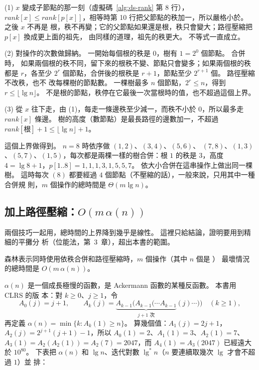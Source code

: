 \begin{whybox}
(1) $x$ 變成子節點的那一刻（虛擬碼~\ref{alg:ds-rank} 第 8 行），$\mathit{rank}[x] \le
\mathit{rank}[p[x]]$，相等時第 10 行把父節點的秩加一，所以嚴格小於。 之後 $x$ 不再是
根，秩不再變；它的父節點如果還是根，秩只會變大；路徑壓縮把 $p[x]$ 換成更上面的祖先，
由同樣的道理，祖先的秩更大。 不等式一直成立。

(2) 對操作的次數做歸納。 一開始每個根的秩是 $0$，樹有 $1 = 2^0$ 個節點。 合併時，
如果兩個根的秩不同，留下來的根秩不變、節點只會變多；如果兩個根的秩都是 $r$，各至少
$2^r$ 個節點，合併後的根秩是 $r + 1$，節點至少 $2^{r+1}$ 個。 路徑壓縮不改秩，也不
改每棵樹的節點數。 一棵樹最多 $n$ 個節點，$2^r \le n$，得到 $r \le \lfloor \lg n
\rfloor$。 不是根的節點，秩停在它最後一次當根時的值，也不超過這個上界。

(3) 從 $x$ 往下走，由 (1)，每走一條邊秩至少減一，而秩不小於 $0$，所以最多走
$\mathit{rank}[x]$ 條邊。 樹的高度（數節點）是最長路徑的邊數加一，不超過
$\mathit{rank}[\text{根}] + 1 \le \lfloor \lg n \rfloor + 1$。
\end{whybox}

這個上界做得到。 $n = 8$ 時依序做 $(1, 2)$、$(3, 4)$、$(5, 6)$、
$(7, 8)$、$(1, 3)$、$(5, 7)$、$(1, 5)$，每次都是兩棵一樣的樹合併：根 $1$ 的秩是 $3$，高度 $4 = \lg 8 + 1$，$p[1..8] = 1, 1,
1, 3, 1, 5, 5, 7$。 依大小合併在這串操作上做出同一棵樹。 這時每次
$(8)$ 都要經過 $4$ 個節點（不壓縮的話），一般來說，只用其中一種合併規
則，$m$ 個操作的總時間是 $\Theta(m \lg n)$。


\subsection{加上路徑壓縮：$O(m\,\alpha(n))$}

兩個技巧一起用，總時間的上界降到幾乎是線性。 這裡只給結論，證明要用到精細的平攤分
析（位能法，第~3~章），超出本書的範圍。

\begin{theorem}
\label{thm:ds-alpha}
森林表示同時使用依秩合併和路徑壓縮時，$m$ 個操作（其中 $n$ 個是 ）
最壞情況的總時間是 $O(m\,\alpha(n))$。
\end{theorem}

$\alpha(n)$ 是一個成長極慢的函數，是 Ackermann 函數的某種反函數。 本書用 CLRS 的版
本：對 $k \ge 0$、$j \ge 1$，令
\[
A_0(j) = j + 1, \qquad A_k(j) = \underbrace{A_{k-1}(A_{k-1}(\cdots A_{k-1}}_{j + 1
\text{ 次}}(j)\cdots)) \quad (k \ge 1),
\]
再定義 $\alpha(n) = \min\{k : A_k(1) \ge n\}$。 算幾個值：$A_1(j) = 2j + 1$，
$A_2(j) = 2^{j+1}(j + 1) - 1$，所以 $A_0(1) = 2$、$A_1(1) = 3$、$A_2(1) = 7$、$A_3(1)
= A_2(A_2(1)) = A_2(7) = 2047$，而 $A_4(1) = A_3(2047)$ 已經遠大於 $10^{80}$。 下表把
$\alpha(n)$ 和 $\lg n$、迭代對數 $\lg^* n$（$n$ 要連續取幾次 $\lg$ 才會不超過 $1$）並
排：

